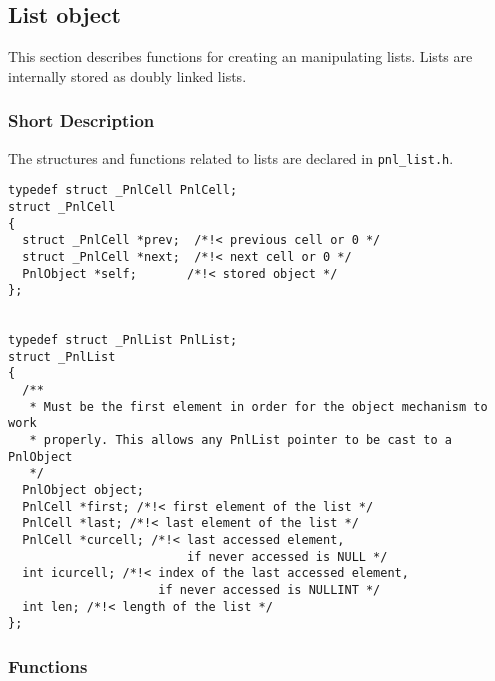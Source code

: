 \subsection{List object}

This section describes functions for creating an manipulating lists. Lists are
internally stored as doubly linked lists.

\subsubsection{Short Description}

The structures and functions related to lists are declared in
\verb!pnl_list.h!.

\begin{verbatim}
typedef struct _PnlCell PnlCell;
struct _PnlCell
{
  struct _PnlCell *prev;  /*!< previous cell or 0 */
  struct _PnlCell *next;  /*!< next cell or 0 */
  PnlObject *self;       /*!< stored object */
};


typedef struct _PnlList PnlList;
struct _PnlList
{
  /**
   * Must be the first element in order for the object mechanism to work
   * properly. This allows any PnlList pointer to be cast to a PnlObject
   */
  PnlObject object; 
  PnlCell *first; /*!< first element of the list */
  PnlCell *last; /*!< last element of the list */
  PnlCell *curcell; /*!< last accessed element,
                         if never accessed is NULL */
  int icurcell; /*!< index of the last accessed element,
                     if never accessed is NULLINT */
  int len; /*!< length of the list */
};
\end{verbatim}

\subsubsection{Functions}

